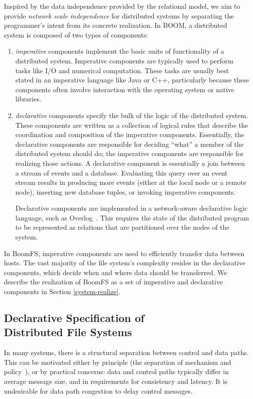 \documentclass[twocolumn]{article}
\begin{document}
Inspired by the data independence provided by the relational model, we
aim to provide \emph{network scale independence} for distributed
systems by separating the programmer's intent from its concrete
realization. In BOOM, a distributed system is composed of two types of
components:
\begin{enumerate}
\item
  \emph{imperative} components implement the basic units of
  functionality of a distributed system. Imperative components are
  typically used to perform tasks like I/O and numerical
  computation. These tasks are usually best stated in an imperative
  language like Java or C++, particularly because these components
  often involve interaction with the operating system or native
  libraries.

\item
  \emph{declarative} components specify the bulk of the logic of the
  distributed system. These components are written as a collection of
  logical rules that describe the coordination and composition of the
  imperative components. Essentially, the declarative components are
  responsible for deciding ``what'' a member of the distributed system
  should do; the imperative components are responsible for realizing
  those actions. A declarative component is essentially a join between
  a stream of events and a database. Evaluating this query over an
  event stream results in producing more events (either at the local
  node or a remote node), inserting new database tuples, or invoking
  imperative components.

  Declarative components are implemented in a network-aware
  declarative logic language, such as Overlog~\cite{dn-sigmod}. This
  requires the state of the distributed program to be represented as
  relations that are partitioned over the nodes of the system.
\end{enumerate}

In BoomFS, imperative components are used to efficiently transfer data
between hosts. The vast majority of the file system's complexity
resides in the declarative components, which decide when and where
data should be transferred. We describe the realization of BoomFS as a
set of imperative and declarative components in Section
\ref{system-realize}.

\subsection{Declarative Specification of\\Distributed File Systems}
In many systems, there is a structural separation between control and
data paths. This can be motivated either by principle (the separation
of mechanism and policy~\cite{hydra-policy-mech-sep}), or by practical
concerns: data and control paths typically differ in average message
size, and in requirements for consistency and latency. It is
undesirable for data path congestion to delay control messages.
\end{document}
